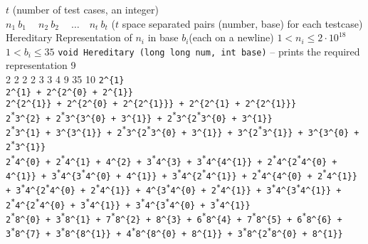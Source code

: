 \documentclass[../../Problems]{subfiles}
\begin{document}
\begin{testcasesFunctionMore}
	{$t$ \hfill(number of test cases, an integer)\\
	$n_1\ b_1\ \quad n_2\ b_2\ \quad \ldots\quad n_t\ b_t$ \hfill($t$ space separated pairs (number, base) for each testcase)}
	{Hereditary Representation of $n_i$ in base $b_i$\hfill(each on a newline)}
	{$1 < n_i \leq 2 \cdot 10^{18}$\\
	$1 < b_i \leq 35$}
	{\texttt{void Hereditary (long long num, int base)} -- prints the required representation}
	{9\\2 2 2 2 3 3 4 9 35 10}
	{\texttt{2\^{}\{1\}}\\[0.7em]
\texttt{2\^{}\{1\} + 2\^{}\{2\^{}\{0\} + 2\^{}\{1\}\}}\\[0.7em]
\texttt{2\^{}\{2\^{}\{1\}\} + 2\^{}\{2\^{}\{0\} + 2\^{}\{2\^{}\{1\}\}\} + 2\^{}\{2\^{}\{1\} + 2\^{}\{2\^{}\{1\}\}\}}\\[0.7em]
\texttt{2\textsuperscript{*}3\^{}\{2\} + 2\textsuperscript{*}3\^{}\{3\^{}\{0\} + 3\^{}\{1\}\} + 2\textsuperscript{*}3\^{}\{2\textsuperscript{*}3\^{}\{0\} + 3\^{}\{1\}\}}\\[0.7em]
\texttt{2\textsuperscript{*}3\^{}\{1\} + 3\^{}\{3\^{}\{1\}\} + 2\textsuperscript{*}3\^{}\{2\textsuperscript{*}3\^{}\{0\} + 3\^{}\{1\}\} + 3\^{}\{2\textsuperscript{*}3\^{}\{1\}\} + 3\^{}\{3\^{}\{0\} + 2\textsuperscript{*}3\^{}\{1\}\}}\\[0.7em]
\texttt{2\textsuperscript{*}4\^{}\{0\} + 2\textsuperscript{*}4\^{}\{1\} + 4\^{}\{2\} + 3\textsuperscript{*}4\^{}\{3\} + 3\textsuperscript{*}4\^{}\{4\^{}\{1\}\} + 2\textsuperscript{*}4\^{}\{2\textsuperscript{*}4\^{}\{0\} + 4\^{}\{1\}\} + 3\textsuperscript{*}4\^{}\{3\textsuperscript{*}4\^{}\{0\} + 4\^{}\{1\}\} + 3\textsuperscript{*}4\^{}\{2\textsuperscript{*}4\^{}\{1\}\} + 2\textsuperscript{*}4\^{}\{4\^{}\{0\} + 2\textsuperscript{*}4\^{}\{1\}\} + 3\textsuperscript{*}4\^{}\{2\textsuperscript{*}4\^{}\{0\} + 2\textsuperscript{*}4\^{}\{1\}\} + 4\^{}\{3\textsuperscript{*}4\^{}\{0\} + 2\textsuperscript{*}4\^{}\{1\}\} + 3\textsuperscript{*}4\^{}\{3\textsuperscript{*}4\^{}\{1\}\} + 2\textsuperscript{*}4\^{}\{2\textsuperscript{*}4\^{}\{0\} + 3\textsuperscript{*}4\^{}\{1\}\} + 3\textsuperscript{*}4\^{}\{3\textsuperscript{*}4\^{}\{0\} + 3\textsuperscript{*}4\^{}\{1\}\}}\\[0.7em]
\texttt{2\textsuperscript{*}8\^{}\{0\} + 3\textsuperscript{*}8\^{}\{1\} + 7\textsuperscript{*}8\^{}\{2\} + 8\^{}\{3\} + 6\textsuperscript{*}8\^{}\{4\} + 7\textsuperscript{*}8\^{}\{5\} + 6\textsuperscript{*}8\^{}\{6\} + 3\textsuperscript{*}8\^{}\{7\} + 3\textsuperscript{*}8\^{}\{8\^{}\{1\}\} + 4\textsuperscript{*}8\^{}\{8\^{}\{0\} + 8\^{}\{1\}\} + 3\textsuperscript{*}8\^{}\{2\textsuperscript{*}8\^{}\{0\} + 8\^{}\{1\}\}}\\[0.7em]
}
\end{testcasesFunctionMore}
\end{document}

